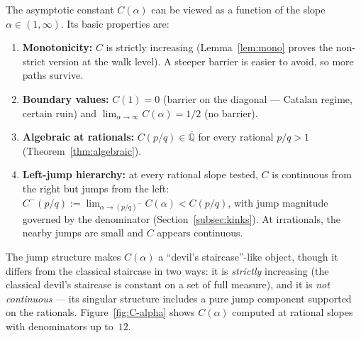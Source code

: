 \documentclass[11pt]{article}
\theoremstyle{definition}
\theoremstyle{remark}
\newcommand{\Q}{\mathbb{Q}}
\begin{document}
The asymptotic constant $C(\alpha)$ can be viewed as a function of the
slope $\alpha \in (1, \infty)$.
Its basic properties are:

\begin{enumerate}
\item \textbf{Monotonicity:} $C$ is strictly increasing
  (Lemma~\ref{lem:mono} proves the non-strict version at the walk
  level).
  A steeper barrier is easier to avoid, so more paths survive.
\item \textbf{Boundary values:} $C(1) = 0$ (barrier on the diagonal
  --- Catalan regime, certain ruin) and
  $\lim_{\alpha \to \infty} C(\alpha) = 1/2$ (no barrier).
\item \textbf{Algebraic at rationals:} $C(p/q) \in \overline{\Q}$ for
  every rational $p/q > 1$ (Theorem~\ref{thm:algebraic}).
\item \textbf{Left-jump hierarchy:} at every rational slope tested,
  $C$ is continuous from the right but jumps from the left:
  $C^-(p/q) := \lim_{\alpha \to (p/q)^-} C(\alpha) < C(p/q)$, with
  jump magnitude governed by the denominator
  (Section~\ref{subsec:kinks}).
  At irrationals, the nearby jumps are small and $C$ appears
  continuous.
\end{enumerate}

The jump structure makes $C(\alpha)$ a ``devil's staircase''-like
object, though it differs from the classical staircase in two ways:
it is \emph{strictly} increasing (the classical devil's staircase is
constant on a set of full measure), and it is \emph{not continuous} ---
its singular structure includes a pure jump component supported on
the rationals.
Figure~\ref{fig:C-alpha} shows $C(\alpha)$ computed at rational
slopes with denominators up to~$12$.
\end{document}
